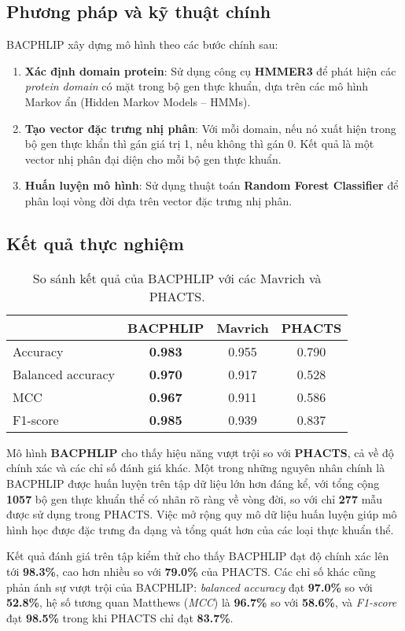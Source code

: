 \subsection*{Phương pháp và kỹ thuật chính}

BACPHLIP xây dựng mô hình theo các bước chính sau:

\begin{enumerate}
    \item \textbf{Xác định domain protein}: Sử dụng công cụ \textbf{HMMER3} để phát hiện các \textit{protein domain} có mặt trong bộ gen thực khuẩn, dựa trên các mô hình Markov ẩn (Hidden Markov Models – HMMs).
    
    \item \textbf{Tạo vector đặc trưng nhị phân}: Với mỗi domain, nếu nó xuất hiện trong bộ gen thực khẩn thì gán giá trị 1, nếu không thì gán 0. Kết quả là một vector nhị phân đại diện cho mỗi bộ gen thực khuẩn.
    
    \item \textbf{Huấn luyện mô hình}: Sử dụng thuật toán \textbf{Random Forest Classifier} để phân loại vòng đời dựa trên vector đặc trưng nhị phân.
\end{enumerate}

\subsection*{Kết quả thực nghiệm}

\begin{table}[h]
\centering
\caption{So sánh kết quả của BACPHLIP với các Mavrich và PHACTS.}
\label{tab:BACPHLIP_result}
\begin{tabular}{lccc}
\hline
& \textbf{BACPHLIP} & \textbf{Mavrich} & \textbf{PHACTS} \\
\hline
Accuracy          & \textbf{0.983} & 0.955 & 0.790  \\
Balanced accuracy & \textbf{0.970} & 0.917 & 0.528 \\
MCC               & \textbf{0.967} & 0.911 & 0.586 \\
F1-score          & \textbf{0.985} & 0.939 & 0.837 \\
\hline
\end{tabular}
\end{table}

Mô hình \textbf{BACPHLIP} cho thấy hiệu năng vượt trội so với \textbf{PHACTS}, cả về độ chính xác và các chỉ số đánh giá khác. Một trong những nguyên nhân chính là BACPHLIP được huấn luyện trên tập dữ liệu lớn hơn đáng kể, với tổng cộng \textbf{1057} bộ gen thực khuẩn thể có nhãn rõ ràng về vòng đời, so với chỉ \textbf{277} mẫu được sử dụng trong PHACTS. Việc mở rộng quy mô dữ liệu huấn luyện giúp mô hình học được đặc trưng đa dạng và tổng quát hơn của các loại thực khuẩn thể.

Kết quả đánh giá trên tập kiểm thử cho thấy BACPHLIP đạt độ chính xác lên tới \textbf{98.3\%}, cao hơn nhiều so với \textbf{79.0\%} của PHACTS. Các chỉ số khác cũng phản ánh sự vượt trội của BACPHLIP: \textit{balanced accuracy} đạt \textbf{97.0\%} so với \textbf{52.8\%}, hệ số tương quan Matthews (\textit{MCC}) là \textbf{96.7\%} so với \textbf{58.6\%}, và \textit{F1-score} đạt \textbf{98.5\%} trong khi PHACTS chỉ đạt \textbf{83.7\%}. 
